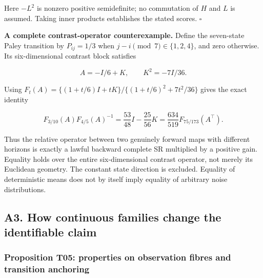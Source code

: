 \documentclass[11pt,a4paper]{article}
\begin{document}
Here \(-L^2\) is nonzero positive semidefinite; no commutation of \(H\)
and \(L\) is assumed. Taking inner products establishes the stated
scores. \(\square\)

\par
\noindent\begin{minipage}{\linewidth}

\textbf{A complete contrast-operator counterexample.} Define the
seven-state Paley transition by \(P_{ij}=1/3\) when
\(j-i\pmod7\in\{1,2,4\}\), and zero otherwise. Its six-dimensional
contrast block satisfies

\[
A=-I/6+K,\qquad K^2=-7I/36.
\]

\end{minipage}\par

\par
\noindent\begin{minipage}{\linewidth}

Using \(F_t(A)=\{(1+t/6)I+tK\}/\{(1+t/6)^2+7t^2/36\}\) gives the exact
identity

\[
F_{3/10}(A)F_{4/5}(A)^{-1}
=\frac{53}{48}I-\frac{25}{56}K
=\frac{634}{519}F_{75/173}(A^\top).
\]

\end{minipage}\par

Thus the relative operator between two genuinely forward maps with
different horizons is exactly a lawful backward complete SR multiplied
by a positive gain. Equality holds over the entire six-dimensional
contrast operator, not merely its Euclidean geometry. The constant state
direction is excluded. Equality of deterministic means does not by
itself imply equality of arbitrary noise distributions.

\subsection{A3. How continuous families change the identifiable
claim}\label{a3.-how-continuous-families-change-the-identifiable-claim}

\subsubsection{Proposition T05: properties on observation fibres and
transition
anchoring}\label{proposition-t05-properties-on-observation-fibres-and-transition-anchoring}
\end{document}
